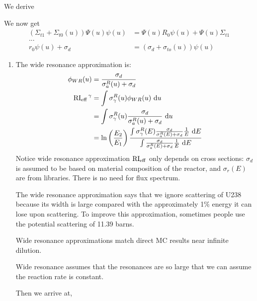 \documentclass{school-22.211-notes}
\date{February 27, 2012}
\begin{document}
\maketitle

\clearpage
{}
We derive 

We now get 
\begin{align}
 (\Sigma_{t1} + \Sigma_{t0} (u)) \Psi(u) \psi(u) &= \Psi(u) R_0 \psi(u) + \Psi(u) \Sigma_{t1}     \\
... \\
r_0 \psi(u) + \sigma_d &= (\sigma_d + \sigma_{to}(u)) \psi(u) 
\end{align}



\begin{enumerate}
\item The wide resonance approximation is: 
\begin{align}
\phi_{WR} (u) &= \frac{\sigma_d}{\sigma_{a}^R (u) +  \sigma_d } \\
\left. \mathrm{RI}_{\mathrm{eff}} \right.^{\gamma} &= \int \sigma_{\gamma}^R (u) \phi_{WR} (u) \mbox{ }\mathrm{d} u \\
&= \int \sigma_{\gamma}^R (u) \frac{\sigma_d}{\sigma_a^R(u) + \sigma_d} \mbox{ }\mathrm{d} u \\
&= \ln\left( \frac{E_2}{E_1} \right) \frac{ \int \sigma_{\gamma}^R (E) \frac{\sigma_d}{\sigma_{a}^R(E) + \sigma_d} \frac{1}{E} \mbox{ }\mathrm{d} E}{ \int \frac{\sigma_d}{\sigma_{a}^R(E) + \sigma_d} \frac{1}{E} \mbox{ }\mathrm{d} E}
\end{align}
Notice wide resonance approximation $\mathrm{RI}_{\mathrm{eff}}$ only depends on cross sections: $\sigma_d$ is assumed to be based on material composition of the reactor, and $\sigma_r(E)$ are from libraries. There is no need for flux spectrum. 

The wide resonance approximation says that we ignore scattering of U238 because its width is large compared with the approximately 1\% energy it can lose upon scattering. To improve this approximation, sometimes people use the potential scattering of 11.39 barns. 

Wide resonance approximations match direct MC results near infinite dilution. 


%
Wide resonance assumes that the resonances are so large that we can assume the reaction rate is constant. 


Then we arrive at, 




\end{enumerate}
\end{document}
